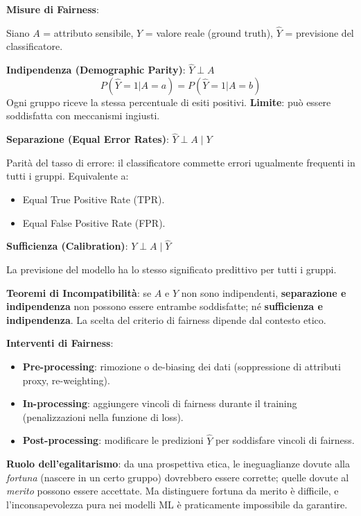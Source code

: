 \documentclass[a4paper,11pt]{article}
\begin{document}
\textbf{Misure di Fairness}:

Siano $A$ = attributo sensibile, $Y$ = valore reale (ground truth), $\hat{Y}$ = previsione del classificatore.

\textbf{Indipendenza (Demographic Parity)}: $\hat{Y} \perp A$
\[
P(\hat{Y}=1|A=a) = P(\hat{Y}=1|A=b)
\]
Ogni gruppo riceve la stessa percentuale di esiti positivi. \textbf{Limite}: pu\`{o} essere soddisfatta con meccanismi ingiusti.

\textbf{Separazione (Equal Error Rates)}: $\hat{Y} \perp A \mid Y$

Parit\`{a} del tasso di errore: il classificatore commette errori ugualmente frequenti in tutti i gruppi. Equivalente a:
\begin{itemize}
  \item Equal True Positive Rate (TPR).
  \item Equal False Positive Rate (FPR).
\end{itemize}

\textbf{Sufficienza (Calibration)}: $Y \perp A \mid \hat{Y}$

La previsione del modello ha lo stesso significato predittivo per tutti i gruppi.

\textbf{Teoremi di Incompatibilit\`{a}}: se $A$ e $Y$ non sono indipendenti, \textbf{separazione e indipendenza} non possono essere entrambe soddisfatte; n\'{e} \textbf{sufficienza e indipendenza}. La scelta del criterio di fairness dipende dal contesto etico.

\textbf{Interventi di Fairness}:
\begin{itemize}
  \item \textbf{Pre-processing}: rimozione o de-biasing dei dati (soppressione di attributi proxy, re-weighting).
  \item \textbf{In-processing}: aggiungere vincoli di fairness durante il training (penalizzazioni nella funzione di loss).
  \item \textbf{Post-processing}: modificare le predizioni $\hat{Y}$ per soddisfare vincoli di fairness.
\end{itemize}

\textbf{Ruolo dell'egalitarismo}: da una prospettiva etica, le ineguaglianze dovute alla \emph{fortuna} (nascere in un certo gruppo) dovrebbero essere corrette; quelle dovute al \emph{merito} possono essere accettate. Ma distinguere fortuna da merito \`{e} difficile, e l'inconsapevolezza pura nei modelli ML \`{e} praticamente impossibile da garantire.
\end{document}
